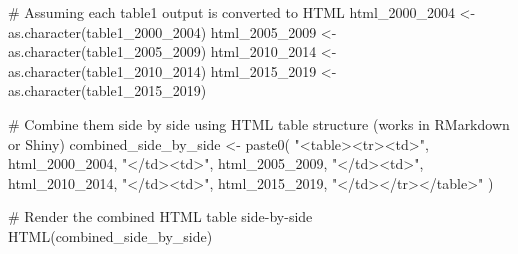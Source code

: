 \documentclass[
  letterpaper,
  DIV=11,
  numbers=noendperiod]{scrartcl}
\newenvironment{Shaded}{\begin{snugshade}}{\end{snugshade}}
\newcommand{\CommentTok}[1]{\textcolor[rgb]{0.37,0.37,0.37}{#1}}
\newcommand{\FunctionTok}[1]{\textcolor[rgb]{0.28,0.35,0.67}{#1}}
\newcommand{\NormalTok}[1]{\textcolor[rgb]{0.00,0.23,0.31}{#1}}
\newcommand{\OtherTok}[1]{\textcolor[rgb]{0.00,0.23,0.31}{#1}}
\newcommand{\StringTok}[1]{\textcolor[rgb]{0.13,0.47,0.30}{#1}}
\begin{document}
\begin{Shaded}
\begin{Highlighting}[]
\CommentTok{\# Assuming each table1 output is converted to HTML}
\NormalTok{html\_2000\_2004 }\OtherTok{\textless{}{-}} \FunctionTok{as.character}\NormalTok{(table1\_2000\_2004)}
\NormalTok{html\_2005\_2009 }\OtherTok{\textless{}{-}} \FunctionTok{as.character}\NormalTok{(table1\_2005\_2009)}
\NormalTok{html\_2010\_2014 }\OtherTok{\textless{}{-}} \FunctionTok{as.character}\NormalTok{(table1\_2010\_2014)}
\NormalTok{html\_2015\_2019 }\OtherTok{\textless{}{-}} \FunctionTok{as.character}\NormalTok{(table1\_2015\_2019)}

\CommentTok{\# Combine them side by side using HTML table structure (works in RMarkdown or Shiny)}
\NormalTok{combined\_side\_by\_side }\OtherTok{\textless{}{-}} \FunctionTok{paste0}\NormalTok{(}
  \StringTok{"\textless{}table\textgreater{}\textless{}tr\textgreater{}\textless{}td\textgreater{}"}\NormalTok{, html\_2000\_2004, }\StringTok{"\textless{}/td\textgreater{}\textless{}td\textgreater{}"}\NormalTok{, }
\NormalTok{  html\_2005\_2009, }\StringTok{"\textless{}/td\textgreater{}\textless{}td\textgreater{}"}\NormalTok{, html\_2010\_2014, }\StringTok{"\textless{}/td\textgreater{}\textless{}td\textgreater{}"}\NormalTok{, html\_2015\_2019, }\StringTok{"\textless{}/td\textgreater{}\textless{}/tr\textgreater{}\textless{}/table\textgreater{}"}
\NormalTok{)}

\CommentTok{\# Render the combined HTML table side{-}by{-}side}
\FunctionTok{HTML}\NormalTok{(combined\_side\_by\_side)}
\end{Highlighting}
\end{Shaded}
\end{document}
